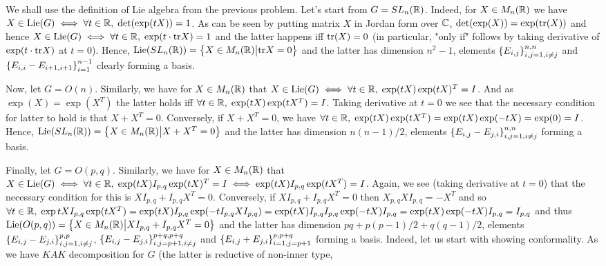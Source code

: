 \documentclass[8pt]{article} %
\newcommand{\Lie}{\mbox{\normalfont{Lie}}}
\newcommand{\tr}{\mbox{\normalfont{tr}}}
\begin{document}
We shall use the definition of Lie algebra from the previous problem. Let's start from $G=SL_n(\mathbb{R})$. Indeed, for
$X\in M_n(\mathbb{R})$ we have $X\in\Lie(G)\iff\forall t\in\R ,\;\det(\exp(tX))=1$. As can be seen by
putting matrix $X$ in Jordan form over $\mathbb{C}$, $\det(\exp(X))=\exp(\tr(X))$ and hence $X\in\Lie(G)\iff\forall t\in\R,\;\exp(t\cdot
\tr X)=1$ and the latter happens iff $\tr(X)=0$ (in particular, "only if" follows by taking derivative of $\exp(t\cdot\tr X)$ at
$t=0$). Hence, $\Lie(SL_n(\R))=\mysetn{X\in M_n(\R)}{\tr X=0}$ and the latter has dimension $n^2-1$, elements $\left\{ E_{i,j} \right\}_{
i,j=1,i\neq j}^{n,n}$ and $\left\{E_{ i,i }-E_{ i+1,i+1 } \right\}_{i=1 }^{n-1}$ clearly forming a basis.\par
Now, let $G=O(n)$. Similarly, we have for $X\in M_n(\mathbb{R})$ that $X\in\Lie(G)\iff \forall t\in\R,\;\exp(tX)\exp(tX)^T=I$. And
as $\exp(X)=\exp(X^T)$ the latter holds iff $\forall  t\in\mathbb{R},\;\exp(tX)\exp(tX^T)=I$. Taking derivative at $t=0$ we see
that the necessary condition for latter to hold is that $X+X^T=0$. Conversely, if $X+X^T=0$, we have $\forall t\in\mathbb{R},\;
\exp(tX)\exp(tX^T)=\exp(tX)\exp(-tX)=\exp(0)=I$. Hence, 
$\Lie(SL_n(\R))=\mysetn{X\in M_n(\R)}{X+X^T=0}$ and
the latter has dimension $n(n-1)/2$, elements $\left\{ E_{ i,j }-E_{ j,i } \right\}_{ i,j=1,i\neq j }^{ n,n }$ forming a basis.\par
Finally, let $G=O(p,q)$. Similarly, we have for $X\in M_n(\mathbb{R})$ that $X\in\Lie(G)\iff \forall t\in\R,\;\exp(tX)I_{ p,q }
\exp(tX)^T=I\iff\exp(tX)I_{ p,q }\exp(tX^T)=I$. Again, we see (taking derivative at $t=0$) that the necessary condition for this is
$XI_{ p,q }+I_{ p,q }X^T=0$. Conversely, if $XI_{ p,q }+I_{ p,q }X^T=0$ then $X_{ p,q }XI_{ p,q }=-X^T$ and so
$\forall t\in\mathbb{R},\;\exp{ tX }I_{ p,q }\exp(tX^T)=
\exp(tX)I_{ p,q }\exp(-tI_{ p,q }XI_{ p,q })=\exp(tX)I_{ p,q }I_{ p,q }\exp(-tX)I_{ p,q }=\exp(tX)\exp(-tX)I_{ p,q }=I_{ p,q }$
and thus 
$\Lie(O(p,q))=\mysetn{X\in M_n(\R)}{XI_{ p,q }+I_{ p,q }X^T=0}$ and
the latter has dimension $pq+p(p-1)/2+q(q-1)/2$, elements 
$\left\{ E_{ i,j }-E_{ j,i } \right\}_{ i,j=1,i\neq j }^{ p,p }$,  
$\left\{ E_{ i,j }-E_{ j,i } \right\}_{ i,j=p+1,i\neq j }^{ p+q,p+q }$ and
$\left\{ E_{ i,j }+E_{ j,i } \right\}_{ i=1,j=p+1 }^{ p,p+q }$
forming a basis.
Indeed, let us start with showing conformality. As we have $KAK$ decomposition for $G$ (the latter is reductive of non-inner type,
\end{document}
